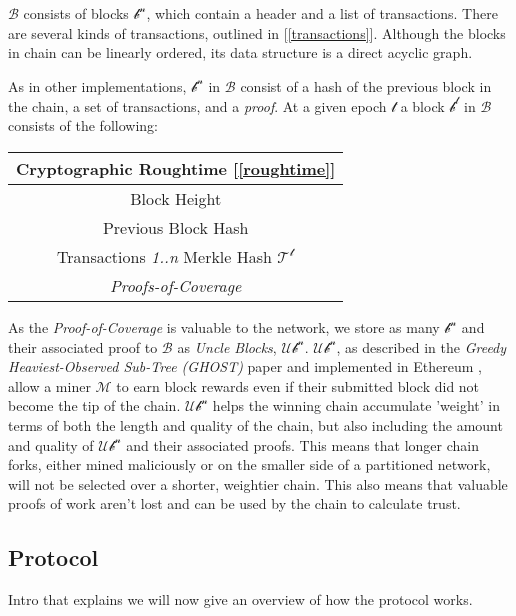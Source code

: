 \documentclass[letterpaper,11pt]{article}
\begin{document}
$\mathcal{B}$ consists of blocks $\mathcal{b^n}$, which contain a header and a list of transactions. There are several kinds of transactions, outlined in [\ref{transactions}]. Although the blocks in chain can be linearly ordered, its data structure is a direct acyclic graph.\newline

As in other implementations, $\mathcal{b^n}$ in $\mathcal{B}$ consist of a hash of the previous block in the chain, a set of transactions, and a \textit{proof}. At a given epoch $\mathcal{t}$ a block $\mathcal{b^t}$ in $\mathcal{B}$ consists of the following:

\begin{center}
	\begin{tabular}{|c|}
		\hline
		 Cryptographic Roughtime [\ref{roughtime}]\\
		 \hline
		 Block Height \\
		\hline
		 Previous Block Hash \\
		 \hline
		 Transactions \textit{1..n} Merkle Hash $\mathcal{T^t}$ \\
		 \hline
		 \textit{Proofs-of-Coverage} \\
		 \hline
	\end{tabular}
\end{center}

As the \textit{Proof-of-Coverage} is valuable to the network, we store as many $\mathcal{b^n}$ and their associated proof to $\mathcal{B}$ as \textit{Uncle Blocks}, $\mathcal{Ub^n}$. $\mathcal{Ub^n}$, as described in the \textit{Greedy Heaviest-Observed Sub-Tree (GHOST)} \cite{ghost} paper and implemented in Ethereum \cite{ethereum}, allow a miner $\mathcal{M}$ to earn block rewards even if their submitted block did not become the tip of the chain. $\mathcal{Ub^n}$ helps the winning chain accumulate 'weight' in terms of both the length and quality of the chain, but also including the amount and quality of $\mathcal{Ub^n}$ and their associated proofs. This means that longer chain forks, either mined maliciously or on the smaller side of a partitioned network, will not be selected over a shorter, weightier chain. This also means that valuable proofs of work aren't lost and can be used by the chain to calculate trust.

\subsection{Protocol}

Intro that explains we will now give an overview of how the protocol works.
\end{document}
